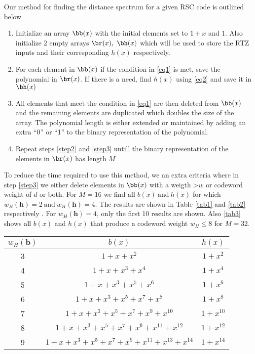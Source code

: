 Our method for finding the distance spectrum for a given RSC code is outlined below
\begin{enumerate}
\item Initialize an array $\bb(x)$ with the initial elements set to $1+x$ and $1$. Also initialize 2 empty arrays $\br(x),~\bh(x)$ which will be used to store the RTZ inputs and their corresponding $h(x)$ respectively.
\item \label{step2} For each element in $\bb(x)$ if the condition in \ref{eq1} is met, save the polynomial in $\br(x)$. If there is a need, find $h(x)$ using \ref{eq2} and save it in $\bh(x)$
\item \label{step3} All elements that meet the condition in \ref{eq1} are then deleted from $\bb(x)$ and the remaining elements are duplicated which doubles the size of the array. The polynomial length is either extended or maintained by adding an extra ``0'' or ``1'' to the binary representation of the polynomial.
\item Repeat steps \ref{step2} and \ref{step3} untill the binary representation of the elements in $\br(x)$ has length $M$
\end{enumerate}
 To reduce the time required to use this method, we an extra criteria where in step \ref{step3} we either delete elements in $\bb(x)$ with a weigth >$w$ or codeword weight of $d$ or both.
 For $M=16$ we find all $b(x) ~\text{and}~ h(x)$ for which $w_H(\textbf{h})=2 ~\text{and} ~ w_H(\textbf{h})=4$. The results are shown in Table \ref{tab1} and \ref{tab2} respectively . For $w_H(\textbf{h})=4$, only the first 10 results are shown.
 Also \ref{tab3} shows all $b(x)$ and $h(x)$ that produce a codeword weight $w_H \leq 8$ for $M=32$.


 
    \begin{table*}[h]
 
 \caption{codewords with parity bit sequence weight $w_H(\textbf{h})=2$}
\centering
 \begin{tabular}{c c c} 
 \hline
 $w_H(\textbf{b})$ & $b(x)$ & $h(x)$ \\ [0.5ex] 
 \hline\hline
 3 &  $1+x+x^2$ & $1+x^2$\\ 
 4 & $1+x+x^3+x^4$ & $1+x^4$ \\
 5 & $1+x+x^3+x^5+x^6$ & $1+x^6$ \\
 6 & $1+x+x^3+x^5+x^7+x^8$& $1+x^8$ \\
 7 & $1+x+x^3+x^5+x^7+x^9+x^{10}$ & $1+x^{10}$ \\
 8 & $1+x+x^3+x^5+x^7+x^9+x^{11}+x^{12}$ & $1+x^{12}$\\ 
 9 & $1+x+x^3+x^5+x^7+x^9+x^{11}+x^{13}+x^{14}$ & $1+x^{14}$ \\ [1ex] 
 \hline
 \end{tabular}
 \label{tab1}
\end{table*}
 
